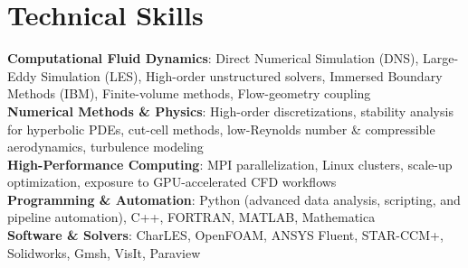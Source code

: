 \documentclass[letterpaper,10.8pt]{article}
\begin{document}
\section{Technical Skills}
\textbf{Computational Fluid Dynamics}: Direct Numerical Simulation (DNS), Large-Eddy Simulation (LES), High-order unstructured solvers, Immersed Boundary Methods (IBM), Finite-volume methods, Flow-geometry coupling\\
\textbf{Numerical Methods \& Physics}: High-order discretizations, stability analysis for hyperbolic PDEs, cut-cell methods, low-Reynolds number \& compressible aerodynamics, turbulence modeling\\
\textbf{High-Performance Computing}: MPI parallelization, Linux clusters, scale-up optimization, exposure to GPU-accelerated CFD workflows\\
\textbf{Programming \& Automation}: Python (advanced data analysis, scripting, and pipeline automation), C++, FORTRAN, MATLAB, Mathematica\\
\textbf{Software \& Solvers}: CharLES, OpenFOAM, ANSYS Fluent, STAR-CCM+, Solidworks, Gmsh, VisIt, Paraview

\end{document}
